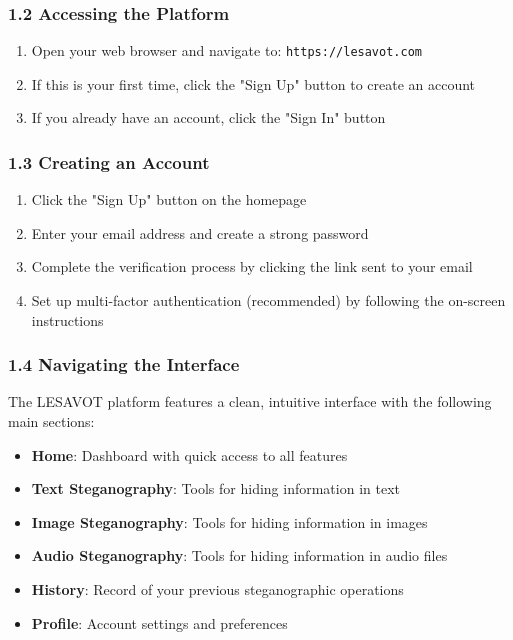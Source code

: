 \documentclass[12pt, a4paper, oneside]{book}
\begin{document}
\subsubsection*{1.2 Accessing the Platform}

\begin{enumerate}
    \item Open your web browser and navigate to: \texttt{https://lesavot.com}
    \item If this is your first time, click the "Sign Up" button to create an account
    \item If you already have an account, click the "Sign In" button
\end{enumerate}

\subsubsection*{1.3 Creating an Account}

\begin{enumerate}
    \item Click the "Sign Up" button on the homepage
    \item Enter your email address and create a strong password
    \item Complete the verification process by clicking the link sent to your email
    \item Set up multi-factor authentication (recommended) by following the on-screen instructions
\end{enumerate}

\subsubsection*{1.4 Navigating the Interface}

The LESAVOT platform features a clean, intuitive interface with the following main sections:

\begin{itemize}
    \item \textbf{Home}: Dashboard with quick access to all features
    \item \textbf{Text Steganography}: Tools for hiding information in text
    \item \textbf{Image Steganography}: Tools for hiding information in images
    \item \textbf{Audio Steganography}: Tools for hiding information in audio files
    \item \textbf{History}: Record of your previous steganographic operations
    \item \textbf{Profile}: Account settings and preferences
\end{itemize}
\end{document}

